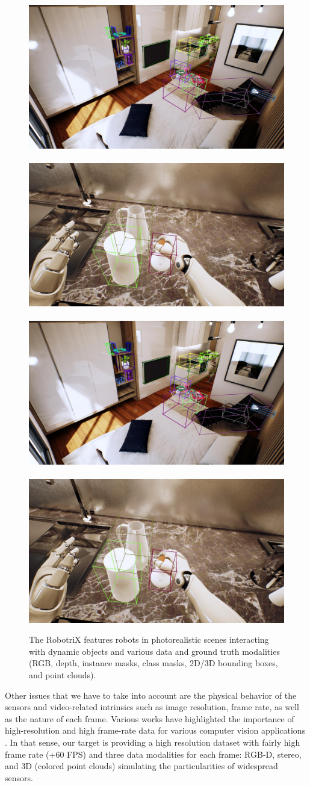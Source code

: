 \begin{figure}[!htb]
    \includegraphics[width=0.48\linewidth]{Figures/Sim2Real/header_bbox}~
    \includegraphics[width=0.48\linewidth]{Figures/Sim2Real/header_bbox_2}\\\ \\
    \includegraphics[width=0.48\linewidth]{Figures/Sim2Real/header_bbox}~
    \includegraphics[width=0.48\linewidth]{Figures/Sim2Real/header_bbox_2}
    \caption{The RobotriX features robots in photorealistic scenes interacting with dynamic objects and various data and ground truth modalities (RGB, depth, instance masks, class masks, 2D/3D bounding boxes, and point clouds).}
    \label{fig:sim2real:robotrix}
\end{figure}

\clearpage

Other issues that we have to take into account are the physical behavior of the sensors and video-related intrinsics such as image resolution, frame rate, as well as the nature of each frame. Various works have highlighted the importance of high-resolution and high frame-rate data for various computer vision applications \cite{Handa2012}\cite{Held2016}. In that sense, our target is providing a high resolution dataset with fairly high frame rate (+60 FPS) and three data modalities for each frame: RGB-D, stereo, and 3D (colored point clouds) simulating the particularities of widespread sensors.

